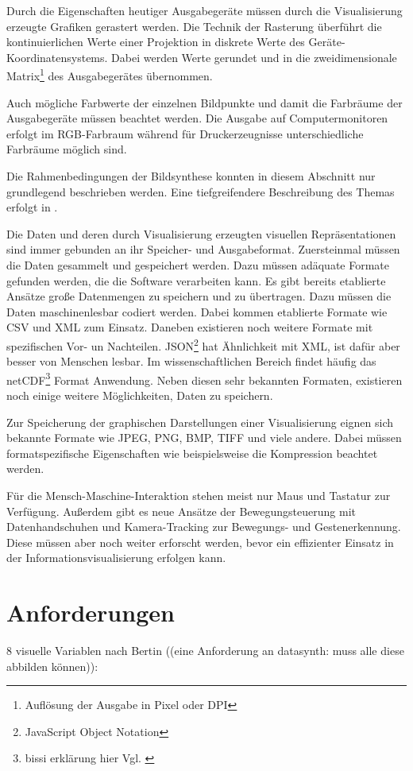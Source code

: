 \documentclass[a4paper, 12pt, DIVcalc, onepage, pdftex, headsepline, footsepline]{scrreprt}
\begin{document}
Durch die Eigenschaften heutiger Ausgabegeräte müssen durch die Visualisierung erzeugte
Grafiken gerastert werden. Die Technik der Rasterung überführt die kontinuierlichen Werte
einer Projektion in diskrete Werte des Geräte-Koordinatensystems. Dabei werden Werte
gerundet und in die zweidimensionale Matrix\footnote{Auflösung der Ausgabe in Pixel oder DPI}
des Ausgabegerätes übernommen.

Auch mögliche Farbwerte der einzelnen Bildpunkte und damit die Farbräume der Ausgabegeräte
müssen beachtet werden. Die Ausgabe auf Computermonitoren erfolgt im RGB-Farbraum während
für Druckerzeugnisse unterschiedliche Farbräume möglich sind.

Die Rahmenbedingungen der Bildsynthese konnten in diesem Abschnitt nur grundlegend beschrieben
werden. Eine tiefgreifendere Beschreibung des Themas erfolgt in \citep{Computergrafik}.

Die Daten und deren durch Visualisierung erzeugten visuellen Repräsentationen sind immer
gebunden an ihr Speicher- und Ausgabeformat.
Zuersteinmal müssen die Daten gesammelt und gespeichert werden. Dazu müssen adäquate
Formate gefunden werden, die die Software verarbeiten kann. Es gibt bereits
etablierte Ansätze große Datenmengen zu speichern und zu übertragen. Dazu müssen
die Daten maschinenlesbar codiert werden. Dabei kommen etablierte Formate wie
CSV und XML zum Einsatz. Daneben existieren noch weitere Formate mit spezifischen
Vor- un Nachteilen. JSON\footnote{JavaScript Object Notation} hat Ähnlichkeit mit XML,
ist dafür aber besser von Menschen lesbar. Im wissenschaftlichen Bereich findet
häufig das netCDF\footnote{bissi erklärung hier Vgl. \citep{Schumann}} Format
Anwendung. Neben diesen sehr bekannten Formaten, existieren noch einige weitere
Möglichkeiten, Daten zu speichern.

Zur Speicherung der graphischen Darstellungen einer Visualisierung eignen sich bekannte
Formate wie JPEG, PNG, BMP, TIFF und viele andere. Dabei müssen formatspezifische
Eigenschaften wie beispielsweise die Kompression beachtet werden.

Für die Mensch-Maschine-Interaktion stehen meist nur Maus und Tastatur zur Verfügung.
Außerdem gibt es neue Ansätze der Bewegungsteuerung mit Datenhandschuhen und
Kamera-Tracking zur Bewegungs- und Gestenerkennung. Diese müssen aber noch weiter
erforscht werden, bevor ein effizienter Einsatz in der Informationsvisualisierung
erfolgen kann.

\section{Anforderungen}
\label{sec:Anforderungen}
8 visuelle Variablen nach Bertin ((eine Anforderung an datasynth: muss alle diese abbilden können)):
\end{document}
